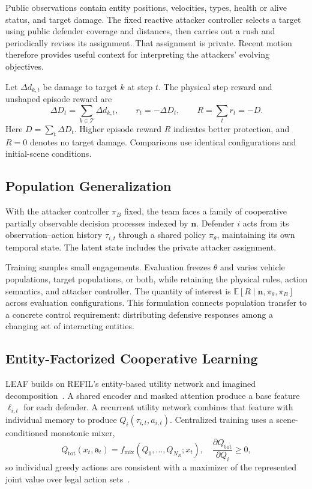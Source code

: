 Public observations contain entity positions, velocities, types, health or alive status, and target damage. The fixed reactive attacker controller selects a target using public defender coverage and distances, then carries out a rush and periodically revises its assignment. That assignment is private. Recent motion therefore provides useful context for interpreting the attackers' evolving objectives.

Let $\Delta d_{k,t}$ be damage to target $k$ at step $t$. The physical step reward and unshaped episode reward are
\begin{equation}
\Delta D_t=\sum_{k\in\mathcal T}\Delta d_{k,t},\qquad
r_t=-\Delta D_t,\qquad R=\sum_t r_t=-D.
\label{eq:damage}
\end{equation}
Here $D=\sum_t\Delta D_t$. Higher episode reward $R$ indicates better protection, and $R=0$ denotes no target damage. Comparisons use identical configurations and initial-scene conditions.

\subsection{Population Generalization}
With the attacker controller $\pi_B$ fixed, the team faces a family of cooperative partially observable decision processes indexed by $\mathbf n$. Defender $i$ acts from its observation--action history $\tau_{i,t}$ through a shared policy $\pi_\theta$, maintaining its own temporal state. The latent state includes the private attacker assignment.

Training samples small engagements. Evaluation freezes $\theta$ and varies vehicle populations, target populations, or both, while retaining the physical rules, action semantics, and attacker controller. The quantity of interest is $\mathbb E[R\mid\mathbf n,\pi_\theta,\pi_B]$ across evaluation configurations. This formulation connects population transfer to a concrete control requirement: distributing defensive responses among a changing set of interacting entities.

\subsection{Entity-Factorized Cooperative Learning}
LEAF builds on REFIL's entity-based utility network and imagined decomposition~\cite{iqbal2021refil}. A shared encoder and masked attention produce a base feature $\ell_{i,t}$ for each defender. A recurrent utility network combines that feature with individual memory to produce $Q_i(\tau_{i,t},a_{i,t})$. Centralized training uses a scene-conditioned monotonic mixer,
\begin{equation}
Q_{\mathrm{tot}}(x_t,\boldsymbol a_t)=f_{\mathrm{mix}}(Q_1,\ldots,Q_{N_R};x_t),
\quad\frac{\partial Q_{\mathrm{tot}}}{\partial Q_i}\geq0,
\end{equation}
so individual greedy actions are consistent with a maximizer of the represented joint value over legal action sets~\cite{rashid2018qmix}.


